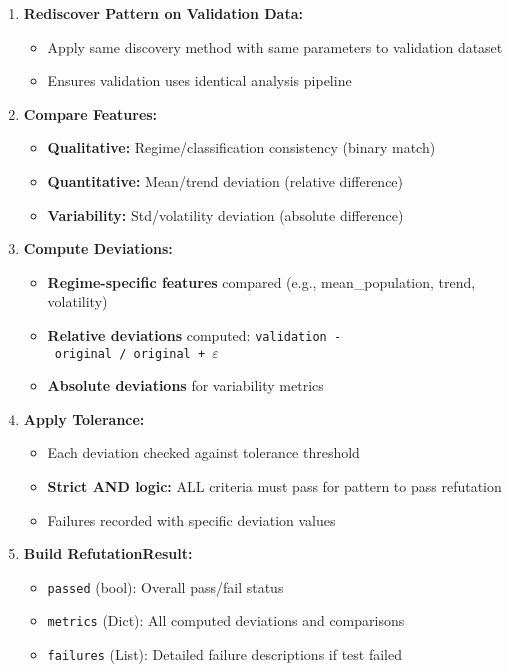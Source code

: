 \documentclass[
]{article}
\providecommand{\tightlist}{%
  \setlength{\itemsep}{0pt}\setlength{\parskip}{0pt}}
\begin{document}
\begin{enumerate}
\def\labelenumi{\arabic{enumi}.}
\tightlist
\item
  \textbf{Rediscover Pattern on Validation Data:}

  \begin{itemize}
  \tightlist
  \item
    Apply same discovery method with same parameters to validation
    dataset
  \item
    Ensures validation uses identical analysis pipeline
  \end{itemize}
\item
  \textbf{Compare Features:}

  \begin{itemize}
  \tightlist
  \item
    \textbf{Qualitative:} Regime/classification consistency (binary
    match)
  \item
    \textbf{Quantitative:} Mean/trend deviation (relative difference)
  \item
    \textbf{Variability:} Std/volatility deviation (absolute difference)
  \end{itemize}
\item
  \textbf{Compute Deviations:}

  \begin{itemize}
  \tightlist
  \item
    \textbf{Regime-specific features} compared (e.g., mean\_population,
    trend, volatility)
  \item
    \textbf{Relative deviations} computed:
    \texttt{\textbar{}validation\ -\ original\textbar{}\ /\ \textbar{}original\ +\ $\varepsilon$\textbar{}}
  \item
    \textbf{Absolute deviations} for variability metrics
  \end{itemize}
\item
  \textbf{Apply Tolerance:}

  \begin{itemize}
  \tightlist
  \item
    Each deviation checked against tolerance threshold
  \item
    \textbf{Strict AND logic:} ALL criteria must pass for pattern to
    pass refutation
  \item
    Failures recorded with specific deviation values
  \end{itemize}
\item
  \textbf{Build RefutationResult:}

  \begin{itemize}
  \tightlist
  \item
    \texttt{passed} (bool): Overall pass/fail status
  \item
    \texttt{metrics} (Dict): All computed deviations and comparisons
  \item
    \texttt{failures} (List): Detailed failure descriptions if test
    failed
  \end{itemize}
\end{enumerate}
\end{document}
